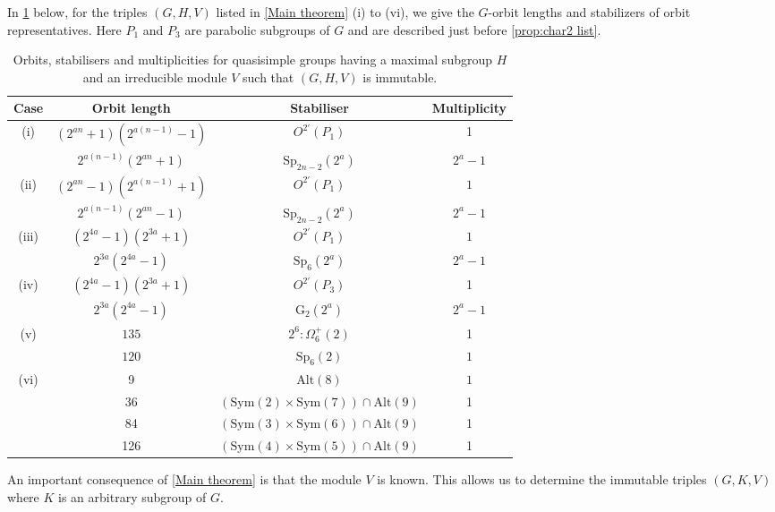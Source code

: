 \documentclass[12pt]{amsart}
\theoremstyle{remark}
\theoremstyle{notation}
\theoremstyle{definition}
\newcommand{\Sp}{\mathrm{Sp}}
\newcommand{\0}{\emptyset}
\newcommand{\Sym}{\mathrm{Sym}}
\newcommand{\Alt}{\mathrm{Alt}}
\begin{document}
In   \cref{Stabilizers of orbit reps} below,  for the triples $(G,H,V)$ listed in \cref{Main theorem} (i) to (vi), we give the $G$-orbit lengths  and stabilizers of orbit representatives. Here $P_1$ and $P_3$ are parabolic subgroups of $G$ and are described just before \cref{prop:char2 list}.


\begin{table}[h!]
\begin{tabular}{cccc}
\hline
Case & Orbit length&Stabiliser&Multiplicity\\
   \hline
 (i) & $(2^{an}+1)(2^{a(n-1)}-1)$&$O^{2'}(P_1)$&1\\& $ 2^{a(n-1)}(2^{an}+1)  $&$\Sp_{2n-2}(2^a)$&$2^a-1$\\
\hline
(ii)   & $(2^{an}-1)(2^{a(n-1)}+1)$&$O^{2'}(P_1)$&$1$\\& $2^{a(n-1)}(2^{an}-1)$&$\Sp_{2n-2}(2^a)$&$2^a-1$\\
\hline
(iii)&$(2^{4a}-1)(2^{3a}+1)$&$O^{2'}(P_1)$&$1$\\& $2^{3a}(2^{4a}-1)$&$\Sp_{6}(2^a)$&$2^a-1$\\
\hline
(iv)&$(2^{4a}-1)(2^{3a}+1)$&$O^{2'}(P_3)$&1\\
&$2^{3a}(2^{4a}-1)$&$\mathrm{G}_2(2^a)$&$2^a-1$\\
\hline
(v)&$135$&$2^6{:}\Omega_6^+(2)$&1\\
&$120$&$\Sp_6(2)$&$1$\\
\hline
(vi)& 9&$\Alt(8)$&$1$\\
&36&$(\Sym(2) \times \Sym(7))\cap \Alt(9)$&1\\
&84&$(\Sym(3)\times \Sym(6))\cap \Alt(9)$&1\\
&126&$(\Sym(4)\times \Sym(5))\cap \Alt(9)$&1\\
\hline
\end{tabular}\vspace{3mm}
\caption{Orbits, stabilisers and multiplicities for quasisimple groups having a maximal subgroup $H$ and an irreducible module $V$ such that $(G,H,V)$ is immutable.}\label{Stabilizers of orbit reps}
\end{table}



An important consequence of \cref{Main theorem} is that the module $V$ is known. This allows us to determine the immutable triples $(G,K,V)$ where $K$ is an arbitrary subgroup of $G$.
\end{document}
